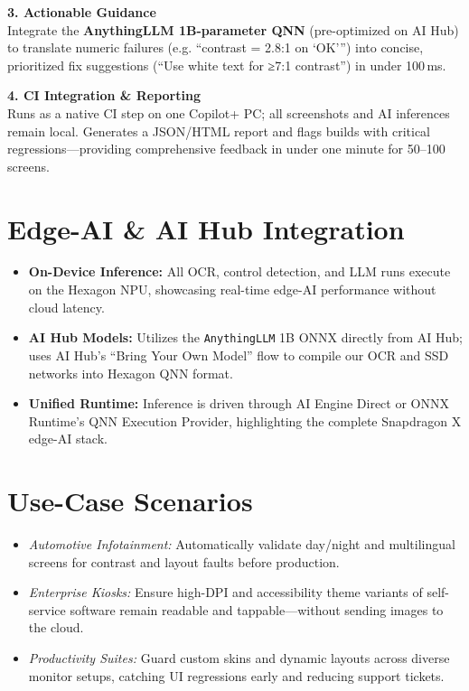 \documentclass[11pt,a4paper]{article}
\newcommand{\sectionline}{
  \nointerlineskip \vspace{1.5ex}
  \par\noindent\makebox[\linewidth]{\rule{\linewidth}{0.4pt}}
  \vspace{1ex}
}
\begin{document}
\medskip
\noindent\textbf{3. Actionable Guidance}\\
Integrate the \textbf{AnythingLLM 1B-parameter QNN} (pre-optimized on AI Hub) to translate numeric failures (e.g. “contrast = 2.8:1 on ‘OK’”) into concise, prioritized fix suggestions (“Use white text for ≥7:1 contrast”) in under 100\,ms.

\medskip
\noindent\textbf{4. CI Integration \& Reporting}\\
Runs as a native CI step on one Copilot+ PC; all screenshots and AI inferences remain local. Generates a JSON/HTML report and flags builds with critical regressions—providing comprehensive feedback in under one minute for 50–100 screens.

\sectionline

\section*{Edge-AI \& AI Hub Integration}
\begin{itemize}[leftmargin=*,itemsep=1ex]
  \item \textbf{On-Device Inference:} All OCR, control detection, and LLM runs execute on the Hexagon NPU, showcasing real-time edge-AI performance without cloud latency.
  \item \textbf{AI Hub Models:} Utilizes the \texttt{AnythingLLM} 1B ONNX directly from AI Hub; uses AI Hub’s “Bring Your Own Model” flow to compile our OCR and SSD networks into Hexagon QNN format.
  \item \textbf{Unified Runtime:} Inference is driven through AI Engine Direct or ONNX Runtime’s QNN Execution Provider, highlighting the complete Snapdragon X edge-AI stack.
\end{itemize}

\sectionline

\section*{Use-Case Scenarios}
\begin{itemize}[leftmargin=*,itemsep=1ex]
  \item \emph{Automotive Infotainment:} Automatically validate day/night and multilingual screens for contrast and layout faults before production.
  \item \emph{Enterprise Kiosks:} Ensure high-DPI and accessibility theme variants of self-service software remain readable and tappable—without sending images to the cloud.
  \item \emph{Productivity Suites:} Guard custom skins and dynamic layouts across diverse monitor setups, catching UI regressions early and reducing support tickets.
\end{itemize}
\end{document}
